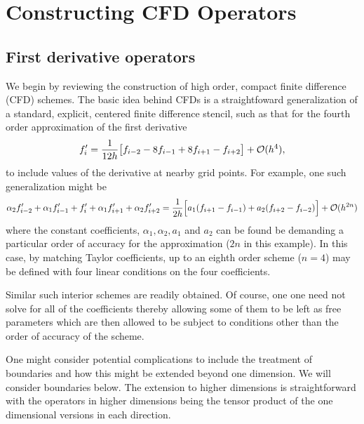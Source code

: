\section{Constructing CFD Operators}
\label{sec:constructing_CFDs}

\subsection{First derivative operators}
\label{sec:first_der}

We begin by reviewing the construction of high order, compact finite difference (CFD) schemes. 
The basic idea behind CFDs is a straightfoward generalization of a standard, explicit, centered finite difference stencil, such as that for the fourth order approximation of the first derivative 
\begin{equation}
    f_i' = \frac{1}{12h} \bigl[ f_{i-2} - 8 f_{i-1} + 8 f_{i+1} - f_{i+2} \bigr] + {\cal O}(h^4) , 
\end{equation}
\label{explicit}
to include values of the derivative at nearby grid points.  For example, one such generalization might be 
\begin{equation}
    \alpha_2 f_{i-2}' + \alpha_1 f_{i-1}' + f_i' + \alpha_1 f_{i+1}' + \alpha_2 f_{i+2}' = {1\over 2h} \Bigl[ a_1 ( f_{i+1} - f_{i-1} ) + a_2 ( f_{i+2} - f_{i-2} ) \Bigr] + {\cal O}(h^{2n}) 
\label{eighth_order_cfd}
\end{equation}
where the constant coefficients, $\alpha_1, \alpha_2, a_1$ and $a_2$ can be found be demanding a particular order of accuracy for the approximation ($2n$ in this example).  In this case, by matching Taylor coefficients, up to an eighth order scheme ($n=4$) may be defined with four linear conditions on the four coefficients.    

Similar such interior schemes are readily obtained.  Of course, one one need not solve for all of the coefficients thereby allowing some of them to be left as free parameters which are then allowed to be subject to conditions other than the order of accuracy of the scheme.  

One might consider potential complications to include the treatment of boundaries and how this might be extended beyond one dimension.  We will consider boundaries below.  The extension to higher dimensions is straightforward with the operators in higher dimensions being the tensor product of the one dimensional versions in each direction.   

